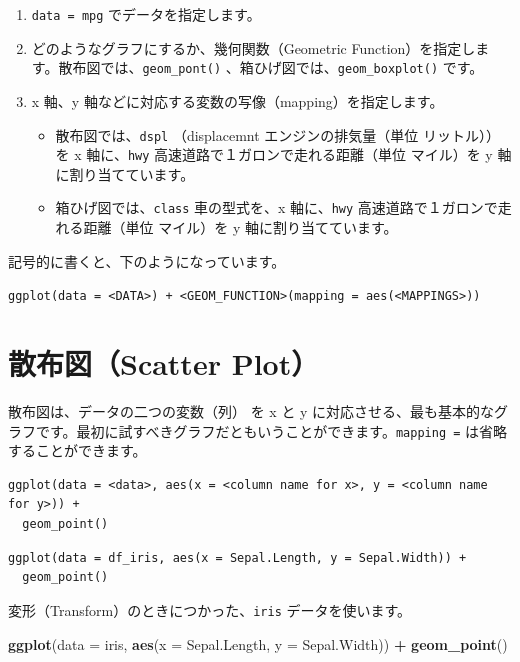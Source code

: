 \documentclass[
  xelatex, ja=standard]{bxjsbook}
\newenvironment{Shaded}{\begin{snugshade}}{\end{snugshade}}
\newcommand{\AttributeTok}[1]{\textcolor[rgb]{0.13,0.29,0.53}{#1}}
\newcommand{\FunctionTok}[1]{\textcolor[rgb]{0.13,0.29,0.53}{\textbf{#1}}}
\newcommand{\NormalTok}[1]{#1}
\newcommand{\SpecialCharTok}[1]{\textcolor[rgb]{0.81,0.36,0.00}{\textbf{#1}}}
\theoremstyle{definition}
\theoremstyle{definition}
\theoremstyle{definition}
\theoremstyle{definition}
\theoremstyle{remark}
\begin{document}
\begin{enumerate}
\def\labelenumi{\arabic{enumi}.}
\item
  \texttt{data\ =\ mpg} でデータを指定します。
\item
  どのようなグラフにするか、幾何関数（Geometric Function）を指定します。散布図では、\texttt{geom\_pont()} 、箱ひげ図では、\texttt{geom\_boxplot()} です。
\item
  x 軸、y 軸などに対応する変数の写像（mapping）を指定します。

  \begin{itemize}
  \item
    散布図では、\texttt{dspl} （displacemnt エンジンの排気量（単位 リットル））を x 軸に、\texttt{hwy} 高速道路で１ガロンで走れる距離（単位 マイル）を y 軸に割り当てています。
  \item
    箱ひげ図では、\texttt{class} 車の型式を、x 軸に、\texttt{hwy} 高速道路で１ガロンで走れる距離（単位 マイル）を y 軸に割り当てています。
  \end{itemize}
\end{enumerate}

記号的に書くと、下のようになっています。

\texttt{ggplot(data\ =\ \textless{}DATA\textgreater{})\ +\ \textless{}GEOM\_FUNCTION\textgreater{}(mapping\ =\ aes(\textless{}MAPPINGS\textgreater{}))}

\hypertarget{ux6563ux5e03ux56f3scatter-plot}{%
\section{散布図（Scatter Plot）}\label{ux6563ux5e03ux56f3scatter-plot}}

散布図は、データの二つの変数（列） を x と y に対応させる、最も基本的なグラフです。最初に試すべきグラフだともいうことができます。\texttt{mapping\ =} は省略することができます。

\begin{verbatim}
ggplot(data = <data>, aes(x = <column name for x>, y = <column name for y>)) +
  geom_point()
\end{verbatim}

\begin{verbatim}
ggplot(data = df_iris, aes(x = Sepal.Length, y = Sepal.Width)) +
  geom_point()
\end{verbatim}

変形（Transform）のときにつかった、\texttt{iris} データを使います。

\begin{Shaded}
\begin{Highlighting}[]
\FunctionTok{ggplot}\NormalTok{(}\AttributeTok{data =}\NormalTok{ iris, }\FunctionTok{aes}\NormalTok{(}\AttributeTok{x =}\NormalTok{ Sepal.Length, }\AttributeTok{y =}\NormalTok{ Sepal.Width)) }\SpecialCharTok{+}
  \FunctionTok{geom\_point}\NormalTok{()}
\end{Highlighting}
\end{Shaded}
\end{document}
